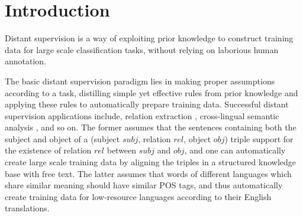 \section{Introduction}




Distant supervision is a way of exploiting prior knowledge  to construct training data for large scale classification tasks, without relying on laborious human annotation. 

The basic distant supervision paradigm lies in making proper assumptions according to a task, distilling simple yet effective rules from prior knowledge and applying these rules to automatically prepare training data. Successful distant supervision applications include, relation extraction \cite{mintz2009distant}, cross-lingual semantic analysis \cite{duong2014can} , and so on. The former assumes that the sentences containing both the subject and object of a (subject $subj$, relation $rel$, object $obj$) triple support for the existence of relation $rel$ between $subj$ and $obj$, and one can automatically create large scale training data by aligning the triples in a structured knowledge base with free text. The latter assumes that words of different languages which share similar meaning should have similar POS tags, and thus automatically create training data for low-resource languages according to their English translations.

